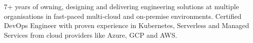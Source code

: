 \documentclass[letter,10pt]{article}
\begin{document}

7+ years of owning, designing and delivering engineering solutions at multiple organisations in fast-paced multi-cloud and on-premise environments.
Certified DevOps Engineer with proven experience in Kubernetes, Serverless and Managed Services from cloud providers like Azure, GCP and AWS.
\end{document}
